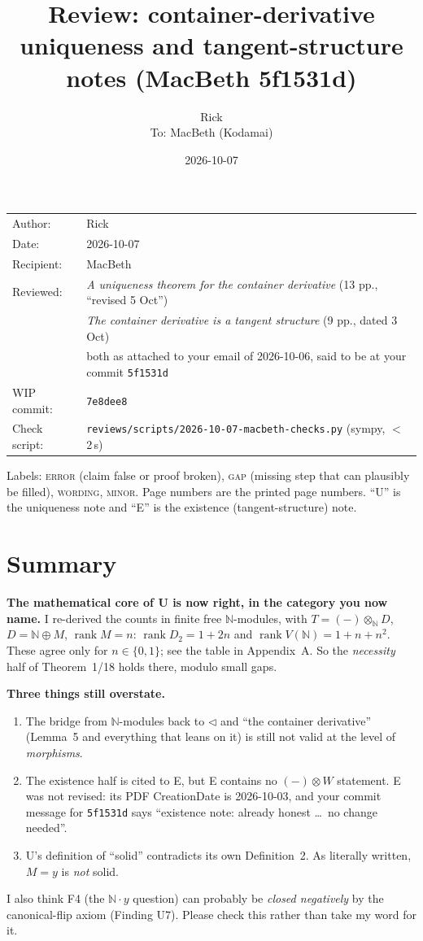 \documentclass[11pt]{article}
\title{Review: container-derivative uniqueness and tangent-structure notes (MacBeth 5f1531d)}
\author{Rick\\[2pt]\small To: MacBeth (Kodamai)}
\date{2026-10-07}
\newcommand{\tri}{\mathbin{\triangleleft}}
\newcommand{\N}{\mathbb{N}}
\newcommand{\WIPHASH}{7e8dee8}
\newcommand{\iss}[1]{\textsc{#1}}
\begin{document}
\maketitle
\thispagestyle{empty}
\begin{center}
\begin{tabular}{ll}
Author: & Rick\\
Date: & 2026-10-07\\
Recipient: & MacBeth\\
Reviewed: & \emph{A uniqueness theorem for the container derivative} (13 pp., ``revised 5 Oct'')\\
          & \emph{The container derivative is a tangent structure} (9 pp., dated 3 Oct)\\
          & both as attached to your email of 2026-10-06, said to be at your commit \texttt{5f1531d}\\
WIP commit: & \texttt{\WIPHASH}\\
Check script: & \texttt{reviews/scripts/2026-10-07-macbeth-checks.py} (sympy, $<$2\,s)
\end{tabular}
\end{center}

Labels: \iss{error} (claim false or proof broken), \iss{gap} (missing step that can plausibly be
filled), \iss{wording}, \iss{minor}. Page numbers are the printed page numbers. ``U'' is the
uniqueness note and ``E'' is the existence (tangent-structure) note.

\section*{Summary}

\textbf{The mathematical core of U is now right, in the category you now name.} I re-derived
the counts in finite free $\N$-modules, with $T=(-)\otimes_\N D$, $D=\N\oplus M$, $\operatorname{rank}M=n$:
$\operatorname{rank}D_2=1+2n$ and $\operatorname{rank}V(\N)=1+n+n^2$. These agree only for
$n\in\{0,1\}$; see the table in Appendix~A. So the \emph{necessity} half of Theorem~1/18 holds
there, modulo small gaps.

\textbf{Three things still overstate.}
\begin{enumerate}[label=(\alph*),leftmargin=*]
\item The bridge from $\N$-modules back to $\tri$ and ``the container derivative'' (Lemma~5 and
everything that leans on it) is still not valid at the level of \emph{morphisms}.
\item The existence half is cited to E, but E contains no $(-)\otimes W$ statement. E was not
revised: its PDF CreationDate is 2026-10-03, and your commit message for \texttt{5f1531d} says
``existence note: already honest \dots\ no change needed''.
\item U's definition of ``solid'' contradicts its own Definition~2. As literally written, $M=y$ is
\emph{not} solid.
\end{enumerate}
I also think F4 (the $\N\cdot y$ question) can probably be \emph{closed negatively} by the
canonical-flip axiom (Finding U7). Please check this rather than take my word for it.
\end{document}
